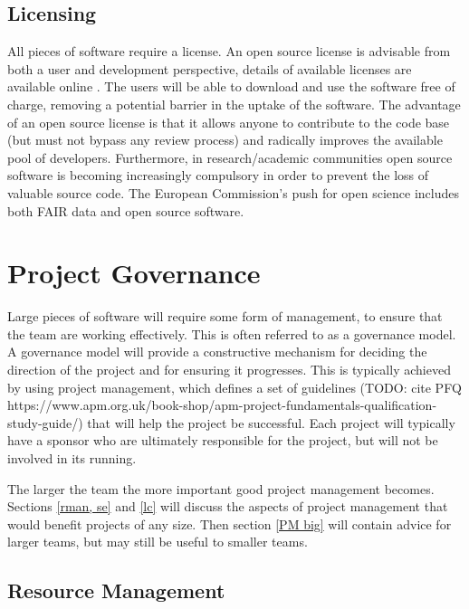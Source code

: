 \documentclass[jnr]{iosart2x}
\begin{document}
\subsection{Licensing}
\label{Licensing}

All pieces of software require a license.
An open source license is advisable from both a user and development perspective, details of available licenses are available online \cite{OSI_Licenses}.
The users will be able to download and use the software free of charge, removing a potential barrier in the uptake of the software.
The advantage of an open source license is that it allows anyone to contribute to the code base (but must not bypass any review process) and radically improves the available pool of developers.
Furthermore, in research/academic communities open source software is becoming increasingly compulsory in order to prevent the loss of valuable source code.
The European Commission's push for open science \cite{EOSC} includes both FAIR data and open source software.  

\section{Project Governance}
\label{Project Governance}

Large pieces of software will require some form of management, to ensure that the team are working effectively.
This is often referred to as a governance model.
A governance model will provide a constructive mechanism for deciding the direction of the project and for ensuring it progresses.
This is typically achieved by using project management, which defines a set of guidelines (TODO: cite PFQ https://www.apm.org.uk/book-shop/apm-project-fundamentals-qualification-study-guide/) that will help the project be successful.
Each project will typically have a sponsor who are ultimately responsible for the project, but will not be involved in its running.

The larger the team the more important good project management becomes.
Sections \ref{rman, se} and \ref{lc} will discuss the aspects of project management that would benefit projects of any size.
Then section \ref{PM big} will contain advice for larger teams, but may still be useful to smaller teams.

\subsection{Resource Management}
\label{rman}
\end{document}
